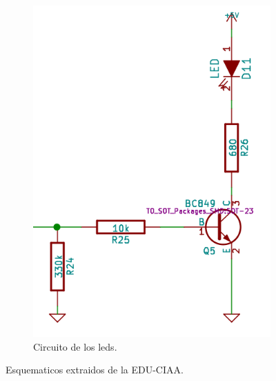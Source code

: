 \begin{figure}[!hp]
\begin{subfigure}{0.4\textwidth}
    \includegraphics[width=1\linewidth]{./Figures/led_sch.png}
    \caption{Circuito de los leds.}
  \end{subfigure}
  \caption{Esquematicos extraidos de la EDU-CIAA.}
  \label{fig:pul_leda_pulses}
\end{figure}

